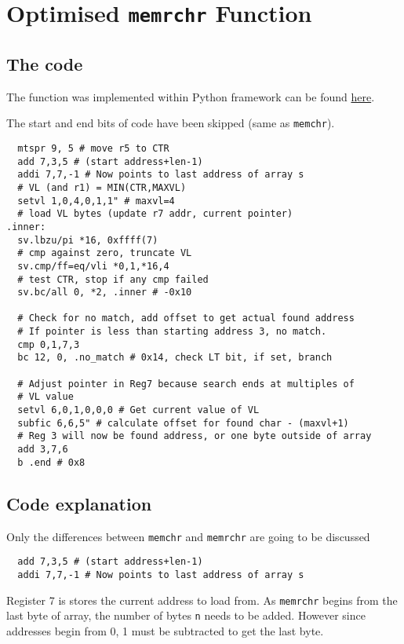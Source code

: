%

\section{Optimised \texttt{memrchr} Function}

\subsection{The code}

The function was implemented within Python framework can be found
\href{https://github.com/ngisearchsvp64/glibc-svp64/blob/master/svp64-port/experimentation/test_memrchr.py}{here}.

The start and end bits of code have been skipped (same as \texttt{memchr}).
\begin{verbatim}
  mtspr 9, 5 # move r5 to CTR
  add 7,3,5 # (start address+len-1)
  addi 7,7,-1 # Now points to last address of array s
  # VL (and r1) = MIN(CTR,MAXVL)
  setvl 1,0,4,0,1,1" # maxvl=4
  # load VL bytes (update r7 addr, current pointer)
.inner:
  sv.lbzu/pi *16, 0xffff(7)
  # cmp against zero, truncate VL
  sv.cmp/ff=eq/vli *0,1,*16,4
  # test CTR, stop if any cmp failed
  sv.bc/all 0, *2, .inner # -0x10

  # Check for no match, add offset to get actual found address
  # If pointer is less than starting address 3, no match.
  cmp 0,1,7,3
  bc 12, 0, .no_match # 0x14, check LT bit, if set, branch

  # Adjust pointer in Reg7 because search ends at multiples of
  # VL value
  setvl 6,0,1,0,0,0 # Get current value of VL
  subfic 6,6,5" # calculate offset for found char - (maxvl+1)
  # Reg 3 will now be found address, or one byte outside of array
  add 3,7,6
  b .end # 0x8
\end{verbatim}

\subsection{Code explanation}
Only the differences between \texttt{memchr} and \texttt{memrchr} are going to
be discussed

\begin{verbatim}
  add 7,3,5 # (start address+len-1)
  addi 7,7,-1 # Now points to last address of array s
\end{verbatim}
Register 7 is stores the current address to load from. As \texttt{memrchr}
begins from the last byte of array, the number of bytes \texttt{n} needs to be
added. However since addresses begin from 0, 1 must be subtracted to get the
last byte.

